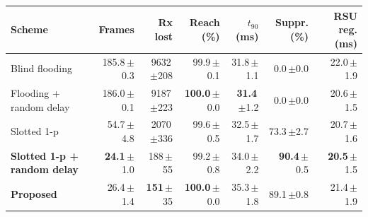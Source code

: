 \renewcommand{\arraystretch}{1.32}
\begin{tabular}{lrrrrrr}
\toprule
\textbf{Scheme} & \textbf{Frames} & \textbf{Rx lost} & \textbf{Reach (\%)} & \textbf{$t_{90}$ (ms)} & \textbf{Suppr. (\%)} & \textbf{RSU reg. (ms)} \\
\midrule
Blind flooding & 185.8{\scriptsize\,$\pm$0.3} & 9632{\scriptsize\,$\pm$208} & 99.9{\scriptsize\,$\pm$0.1} & 31.8{\scriptsize\,$\pm$1.1} & 0.0{\scriptsize\,$\pm$0.0} & 22.0{\scriptsize\,$\pm$1.9} \\
Flooding + random delay & 186.0{\scriptsize\,$\pm$0.1} & 9187{\scriptsize\,$\pm$223} & \textbf{100.0}{\scriptsize\,$\pm$0.0} & \textbf{31.4}{\scriptsize\,$\pm$1.2} & 0.0{\scriptsize\,$\pm$0.0} & 20.6{\scriptsize\,$\pm$1.5} \\
Slotted 1-p & 54.7{\scriptsize\,$\pm$4.8} & 2070{\scriptsize\,$\pm$336} & 99.6{\scriptsize\,$\pm$0.5} & 32.5{\scriptsize\,$\pm$1.7} & 73.3{\scriptsize\,$\pm$2.7} & 20.7{\scriptsize\,$\pm$1.6} \\
\rowcolor{rowBase}\textbf{Slotted 1-p + random delay} & \textbf{24.1}{\scriptsize\,$\pm$1.0} & 188{\scriptsize\,$\pm$55} & 99.2{\scriptsize\,$\pm$0.8} & 34.0{\scriptsize\,$\pm$2.2} & \textbf{90.4}{\scriptsize\,$\pm$0.5} & \textbf{20.5}{\scriptsize\,$\pm$1.5} \\
\rowcolor{rowProp}\textbf{Proposed} & 26.4{\scriptsize\,$\pm$1.4} & \textbf{151}{\scriptsize\,$\pm$35} & \textbf{100.0}{\scriptsize\,$\pm$0.0} & 35.3{\scriptsize\,$\pm$1.8} & 89.1{\scriptsize\,$\pm$0.8} & 21.4{\scriptsize\,$\pm$1.9} \\
\bottomrule
\end{tabular}
